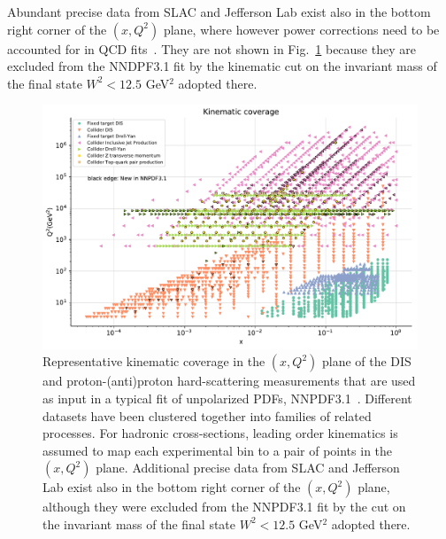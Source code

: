 Abundant precise data from SLAC and Jefferson Lab exist also in the 
bottom right corner of the $(x,Q^2)$ plane, where however power corrections 
need to be accounted for 
in QCD fits~\cite{Alekhin:2017kpj,Owens:2012bv,Accardi:2016qay}.
%
They are not shown in Fig.~\ref{fig:kinplot-report} because they are excluded 
from the NNDPF3.1 fit by the kinematic cut on the invariant mass of the final
state $W^2<12.5$ GeV$^2$ adopted there.

\begin{figure}[!t]
\centering
\includegraphics[scale=0.60]{plots/kinplot-report.pdf}
\caption{\small Representative kinematic coverage in the $(x,Q^2)$ plane
 of the DIS and proton-(anti)proton hard-scattering measurements that are
 used as input in a typical fit of unpolarized PDFs, 
 NNPDF3.1~\cite{Ball:2017nwa}.
 Different datasets have been clustered together into families of
 related processes.
 For hadronic cross-sections, leading order kinematics is assumed to map
 each experimental bin to a pair of points in the $(x,Q^2)$ plane.
 Additional precise data from SLAC and Jefferson Lab exist also in the 
 bottom right corner of the $(x,Q^2)$ plane, although they were excluded from 
 the NNPDF3.1 fit by the cut on the invariant mass of the final 
 state $W^2<12.5$ GeV$^2$ adopted there.}
\label{fig:kinplot-report} 
\end{figure}

